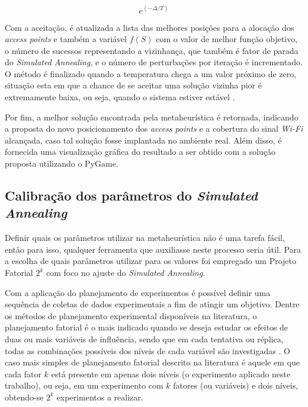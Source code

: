 \documentclass[
	12pt,				%
	twoside,			%
	a4paper,			%
	english,			%
	french,				%
	spanish,			%
	brazil				%
	]{abntex2}
\begin{document}
\begin{equation}
    e^{(-\Delta/T)}
\end{equation}

Com a aceitação, é atualizada a lista das melhores posições para a
alocação dos \emph{access points} e também a variável \(f(S)\) com o
valor de melhor função objetivo, o número de sucessos representando a
vizinhança, que também é fator de parada do \emph{Simulated Annealing},
e o número de perturbações por iteração é incrementado. O método é
finalizado quando a temperatura chega a um valor próximo de zero,
situação esta em que a chance de se aceitar uma solução vizinha pior é
extremamente baixa, ou seja, quando o sistema estiver estável
\cite{VAN}.

Por fim, a melhor solução encontrada pela metaheurística é retornada,
indicando a proposta do novo posicionamento dos \emph{access points} e a
cobertura do sinal \emph{Wi-Fi} alcançada, caso tal solução fosse
implantada no ambiente real. Além disso, é fornecida uma visualização
gráfica do resultado a ser obtido com a solução proposta utilizando o
PyGame.

\subsection{\texorpdfstring{Calibração dos parâmetros do \emph{Simulated
Annealing}}{Calibração dos parâmetros do Simulated Annealing}}\label{calibrauxe7uxe3o-dos-paruxe2metros-do-simulated-annealing}

Definir quais os parâmetros utilizar na metaheurística não é uma tarefa
fácil, então para isso, qualquer ferramenta que auxiliasse neste
processo seria útil. Para a escolha de quais parâmetros utilizar para os
valores foi empregado um Projeto Fatorial \(2^{k}\) com foco no ajuste
do \emph{Simulated Annealing}.

Com a aplicação do planejamento de experimentos é possível definir uma
sequência de coletas de dados experimentais a fim de atingir um
objetivo. Dentre os métodos de planejamento experimental disponíveis na
literatura, o planejamento fatorial é o mais indicado quando se deseja
estudar os efeitos de duas ou mais variáveis de influência, sendo que em
cada tentativa ou réplica, todas as combinações possíveis dos níveis de
cada variável são investigadas \cite{NETO}. O caso mais simples de
planejamento fatorial descrito na literatura é aquele em que cada fator
\(k\) está presente em apenas dois níveis (o experimento aplicado neste
trabalho), ou seja, em um experimento com \(k\) fatores (ou variáveis) e
dois níveis, obtendo-se \(2^{k}\) experimentos a realizar.
\end{document}
